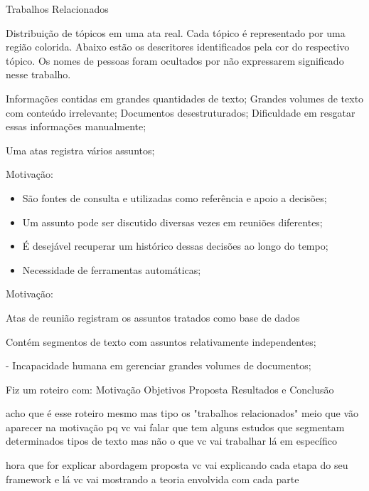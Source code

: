 \begin{frame}{Trabalhos Relacionados}
\caption{Distribuição de tópicos em uma ata real. Cada tópico é representado por uma região colorida. Abaixo estão os descritores identificados pela cor do respectivo tópico. Os nomes de pessoas foram ocultados por não expressarem significado nesse trabalho.}





Informações contidas em grandes quantidades de texto;
Grandes volumes de texto com conteúdo irrelevante;
Documentos desestruturados;
Dificuldade em resgatar essas informações manualmente;


	\item Uma atas registra vários assuntos;

Motivação:
\begin{itemize}
	\item São fontes de consulta e utilizadas como referência e apoio a decisões; 
	\item Um assunto pode ser discutido diversas vezes em reuniões diferentes;
	\item É desejável recuperar um histórico dessas decisões ao longo do tempo;
	\item Necessidade de ferramentas automáticas;
\end{itemize}

Motivação:


Atas de reunião registram os assuntos tratados  como base de dados


\item Contém segmentos de texto com assuntos relativamente independentes; 



- Incapacidade humana em gerenciar grandes volumes de documentos;








Fiz um roteiro com:
Motivação
Objetivos
Proposta
Resultados
e Conclusão


acho que é esse roteiro mesmo
mas tipo
os "trabalhos relacionados"
meio que vão aparecer na motivação
pq vc vai falar que tem alguns estudos que segmentam determinados tipos de texto
mas não o que vc vai trabalhar lá em específico





hora que for explicar abordagem proposta
vc vai explicando cada etapa do seu framework
e lá vc vai mostrando a teoria envolvida com cada parte













\end{frame}
